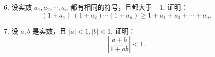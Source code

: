 \documentclass[12pt, a4paper, oneside, UTF8]{ctexbook}
\begin{document}
6. 设实数 $a_1, a_2, \cdots, a_n$ 都有相同的符号，且都大于 $-1$. 证明：
\[ (1 + a_1)\ (1 + a_2) \cdots (1 + a_n) \geq 1 + a_1 + a_2 + \cdots + a_n \text{.} \]

\begin{solution}

\end{solution}

7. 设 $a, b$ 是实数，且 $|a| < 1, |b| < 1$. 证明：
\[ \left| \frac{a + b}{1 + ab} \right| < 1 \text{.} \]

\begin{solution}

\end{solution}

\ifx\allfiles\undefined
\end{document}
